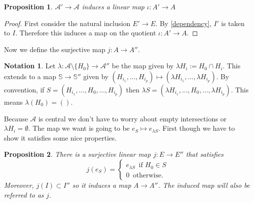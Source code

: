\documentclass[article,twoside]{article}
\newcommand{\BB}[1]{\mathbb{#1}}
\newcommand{\script}[1]{\mathcal{#1}}
\newcommand{\tuples}{\BB{S}}
\theoremstyle{plain}
\theoremstyle{plain}
\theoremstyle{plain}
\newtheorem{proposition}[proposition]{Proposition}
\theoremstyle{plain}
\theoremstyle{plain}
\theoremstyle{definition}
\theoremstyle{definition}
\newtheorem{notation}[notation]{Notation}
\theoremstyle{definition}
\theoremstyle{remark}
\theoremstyle{remark}
\begin{document}
\begin{proposition}\label{OS_injective_map}
	$\script{A}'\to\script{A}$ induces a linear map $\iota: A'\to A$
\end{proposition}
\begin{proof}
	First consider the natural inclusion $E'\to E$. By \autoref{dependency}, $I'$ is taken to $I$. Therefore this induces a map on the quotient $\iota:A'\to A$.
\end{proof}






Now we define the surjective map $j:A\to A''$.

\begin{notation}
	Let $\lambda:\script{A}\setminus\{H_0\}\to \script{A}''$ be the map given by $\lambda H_i:=H_0\cap H_i$. This extends to a map $\tuples\to \tuples''$ given by $(H_{i_1},\dots,H_{i_p})\mapsto (\lambda H_{i_1},\dots,\lambda H_{i_p})$. By convention, if $S=(H_{i_1},\dots,H_0,\dots,H_{i_p})$ then $\lambda S = (\lambda H_{i_1},\dots,\hat{H_0},\dots,\lambda H_{i_p})$. This means $\lambda(H_0) = ()$.
\end{notation}

Because $\script{A}$ is central we don't have to worry about empty intersections or $\lambda H_i=\emptyset$. The map we want is going to be $e_S\mapsto e_{\lambda S}$. First though we have to show it satisfies some nice properties.


\begin{proposition}
	There is a surjective linear map $j:E\to E''$ that satisfies
	$$
		j(e_S) =
		\begin{cases}
			e_{\lambda S} \,\text{ if $H_0\in S$}
			\\
			0 \,\text{ otherwise.}
		\end{cases}
	$$
	Moreover, $j(I)\subset I''$ so it induces a map $A\to A''$. The induced map will also be referred to as $j$.
\end{proposition}
\end{document}
